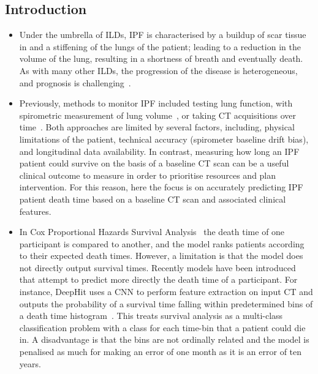 \documentclass[portrait, color=UCLburgundy, margin=1cm]{uclposter}
\begin{document}
    \begin{multicols}{2}
        \section*{Introduction}
            \begin{highlightbox}[UCLlightgreen]
                \begin{itemize}
                    \item Under the umbrella of \glspl{ILD}, \gls{IPF} is  characterised by a buildup of scar tissue in and a stiffening of the lungs of the patient; leading to a reduction in the volume of the lung, resulting in a shortness of breath and eventually death. As with many other \glspl{ILD}, the progression of the disease is heterogeneous, and prognosis is challenging~\cite{King2011IdiopathicFibrosis}.
                    
                    \item Previously, methods to monitor \gls{IPF} included testing lung function, with spirometric measurement of lung volume~\cite{Watters1986AFibrosis}, or taking \gls{CT} acquisitions over time~\cite{Lynch2018DiagnosticPaper}. Both approaches are limited by several factors, including, physical limitations of the patient, technical accuracy (spirometer baseline drift bias), and  longitudinal data availability. In contrast, measuring how long an \gls{IPF} patient could survive on the basis of a baseline \gls{CT} scan can be a useful clinical outcome to measure in order to prioritise resources and plan intervention. For this reason, here the focus is on accurately predicting \gls{IPF} patient death time based on a baseline \gls{CT} scan and associated clinical features.
                    
                    \item In Cox Proportional Hazards Survival Analysis~\cite{Cox1972RegressionLife-Tables} the death time of one participant is compared to another, and the model ranks patients according to their expected death times. However, a limitation is that the model does not directly output survival times. Recently models have been introduced that attempt to predict more directly the death time of a participant. For instance, DeepHit uses a \gls{CNN} to perform feature extraction on input \gls{CT} and outputs the probability of a survival time falling within predetermined bins of a death time histogram~\cite{Lee2018DeepHit:Risks}. This treats survival analysis as a multi-class classification problem with a class for each time-bin that a patient could die in. A disadvantage is that the bins are not ordinally related and the model is penalised as much for making an error of one month as it is an error of ten years.
                    

\end{itemize}
\end{highlightbox}
\end{multicols}
\end{document}
